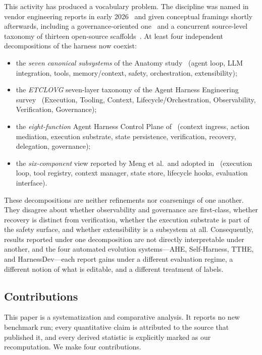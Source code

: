 \documentclass[conference]{IEEEtran}
\begin{document}
This activity has produced a vocabulary problem. The discipline was named in vendor engineering reports in early 2026~\cite{b19,b20} and given conceptual framings shortly afterwards, including a governance-oriented one~\cite{b8} and a concurrent source-level taxonomy of thirteen open-source scaffolds~\cite{b18}. At least four independent decompositions of the harness now coexist:
\begin{itemize}
    \item the \emph{seven canonical subsystems} of the Anatomy study~\cite{b1} (agent loop, LLM integration, tools, memory/context, safety, orchestration, extensibility);
    \item the \emph{ETCLOVG} seven-layer taxonomy of the Agent Harness Engineering survey~\cite{b2} (Execution, Tooling, Context, Lifecycle/Orchestration, Observability, Verification, Governance);
    \item the \emph{eight-function} Agent Harness Control Plane of~\cite{b7} (context ingress, action mediation, execution substrate, state persistence, verification, recovery, delegation, governance);
    \item the \emph{six-component} view reported by Meng et al.\ and adopted in~\cite{b2} (execution loop, tool registry, context manager, state store, lifecycle hooks, evaluation interface).
\end{itemize}
These decompositions are neither refinements nor coarsenings of one another. They disagree about whether observability and governance are first-class, whether recovery is distinct from verification, whether the execution substrate is part of the safety surface, and whether extensibility is a subsystem at all. Consequently, results reported under one decomposition are not directly interpretable under another, and the four automated evolution systems---AHE, Self-Harness, TTHE, and HarnessDev---each report gains under a different evaluation regime, a different notion of what is editable, and a different treatment of labels.

\subsection{Contributions}

This paper is a systematization and comparative analysis. It reports no new benchmark run; every quantitative claim is attributed to the source that published it, and every derived statistic is explicitly marked as our recomputation. We make four contributions.
\end{document}

